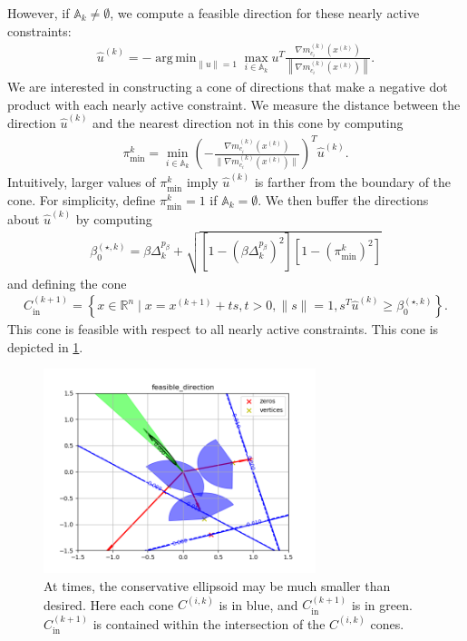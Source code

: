 \documentclass{article}
\theoremstyle{case}
\numberwithin{theorem}{subsection}
\DeclareMathOperator*{\argmin}{arg\,min}
\DeclareMathOperator*{\argmax}{arg\,max}
\newcommand{\activeconstraintsk}{{\mathbb A_{k}}}
\newcommand{\bsk}{{\beta_0^{(\star, k)}}}
\newcommand{\dk}{\Delta_k}
\newcommand{\fcki}{{C^{(k+1)}_{\textrm{in}}}}
\newcommand{\gmcik}{{\nabla m_{c_i}^{(k)}\left(\xk\right)}}
\newcommand{\hgik}{{\frac{\nabla m^{(k)}_{c_i}(\xk)}{\|\nabla m^{(k)}_{c_i}\left(\xk\right)\|}}}
\newcommand{\huk}{{{\hat u}^{(k)}}}
\newcommand{\reals}{\mathbb R}
\newcommand{\Rn}{\mathbb R^n}
\newcommand{\thetamink}{{\pi^k_{\textrm{min}}}}
\newcommand{\xkpo}{{{x}^{(k+1)}}}
\newcommand{\xk}{x^{(k)}}
\newcommand{\fik}{{C^{(i, k)}}}
\begin{document}
However, if $\activeconstraintsk \ne \emptyset$, we compute a feasible direction for these nearly active constraints:
\begin{align}
\huk = -\argmin_{\|u\| = 1} \max_{i \in \activeconstraintsk} u^T \frac{\gmcik}{\left\|\gmcik\right\|}. \label{define_u}
\end{align}
We are interested in constructing a cone of directions that make a negative dot product with each nearly active constraint.
We measure the distance between the direction $\huk$ and the nearest direction not in this cone by computing
\begin{align}
\thetamink = \min_{i \in \activeconstraintsk} \left(-\hgik\right)^T \huk \label{define_thetamink}.
\end{align}
Intuitively, larger values of $\thetamink$ imply $\huk$ is farther from the boundary of the cone.
For simplicity, define $\thetamink = 1$ if $\activeconstraintsk = \emptyset$.
We then buffer the directions about $\huk$ by computing
\begin{align}
\bsk = \beta\dk^{p_{\beta}} + \sqrt{\left[1 - \left(\beta\dk^{p_{\beta}}\right)^2\right]\left[1 - \left(\thetamink\right) ^2\right]} \label{define_bsk}
\end{align}
and defining the cone
\begin{align}
\fcki = \left\{x \in \Rn \; \bigg| \; x = \xkpo + ts, t > 0, \|s\| = 1, s^T\huk \ge \bsk \right\}. \label{define_inner_cone}
\end{align}
This cone is feasible with respect to all nearly active constraints.
This cone is depicted in \cref{feasible_direction}.
\begin{figure}[ht]
    \centering
    \includegraphics[width=300px]{images/feasible_direction.png}
    \caption{
    	At times, the conservative ellipsoid may be much smaller than desired.
    	Here each cone $\fik$ is in blue, and $\fcki$ is in green.
    	$\fcki$ is contained within the intersection of the $\fik$ cones.
	}
    \label{feasible_direction}
\end{figure}
\end{document}
